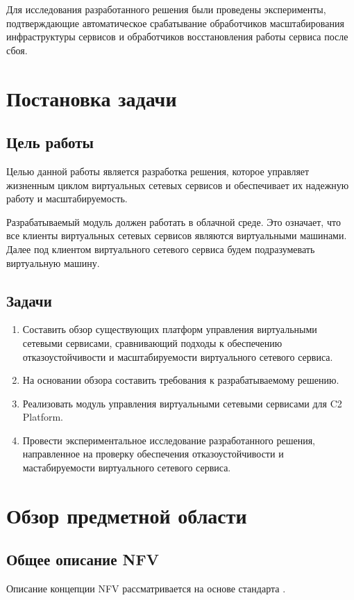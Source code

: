 \documentclass[oneside,final,14pt,a4paper]{extreport}
\begin{document}
Для исследования разработанного решения были проведены эксперименты, подтверждающие автоматическое срабатывание обработчиков масштабирования инфраструктуры сервисов и обработчиков восстановления работы сервиса после сбоя.





\chapter{Постановка задачи}
\label{chap:problem_statement}
\section{Цель работы}
Целью данной работы является разработка решения, которое управляет жизненным циклом виртуальных сетевых сервисов и обеспечивает их надежную работу и масштабируемость.

Разрабатываемый модуль должен работать в облачной среде. Это означает, что все клиенты виртуальных сетевых сервисов являются виртуальными машинами. Далее под клиентом виртуального сетевого сервиса будем подразумевать виртуальную машину.

\section{Задачи}
\begin{enumerate}
	\item Составить обзор существующих платформ управления виртуальными сетевыми сервисами, сравнивающий подходы к обеспечению отказоустойчивости и масштабируемости виртуального сетевого сервиса.
	\item На основании обзора составить требования к разрабатываемому решению.
	\item Реализовать модуль управления виртуальными сетевыми сервисами для C2 Platform.
	\item Провести экспериментальное исследование разработанного решения, направленное на проверку обеспечения отказоустойчивости и мастабируемости виртуального сетевого сервиса.
\end{enumerate}




\chapter{Обзор предметной области}
\label{chap:overview_subject_area}

\section{Общее описание NFV}
\label{sec:nfv_description}
Описание концепции NFV рассматривается на основе стандарта \cite{nfv-official}.
\end{document}
